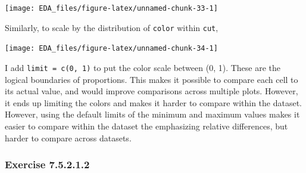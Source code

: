 \documentclass[]{book}
\newenvironment{Shaded}{\begin{snugshade}}{\end{snugshade}}
\newcommand{\DataTypeTok}[1]{\textcolor[rgb]{0.13,0.29,0.53}{#1}}
\newcommand{\DecValTok}[1]{\textcolor[rgb]{0.00,0.00,0.81}{#1}}
\newcommand{\KeywordTok}[1]{\textcolor[rgb]{0.13,0.29,0.53}{\textbf{#1}}}
\newcommand{\NormalTok}[1]{#1}
\newcommand{\OperatorTok}[1]{\textcolor[rgb]{0.81,0.36,0.00}{\textbf{#1}}}
\newcommand{\StringTok}[1]{\textcolor[rgb]{0.31,0.60,0.02}{#1}}
\theoremstyle{plain}
\theoremstyle{remark}
\begin{document}
\begin{center}\texttt{[image: EDA\_files/figure-latex/unnamed-chunk-33-1]} \end{center}

Similarly, to scale by the distribution of \texttt{color} within \texttt{cut},

\begin{Shaded}
\end{Shaded}

\begin{center}\texttt{[image: EDA\_files/figure-latex/unnamed-chunk-34-1]} \end{center}

I add \texttt{limit\ =\ c(0,\ 1)} to put the color scale between (0, 1).
These are the logical boundaries of proportions.
This makes it possible to compare each cell to its actual value, and would improve comparisons across multiple plots.
However, it ends up limiting the colors and makes it harder to compare within the dataset.
However, using the default limits of the minimum and maximum values makes it easier to compare within the dataset the emphasizing relative differences, but harder to compare across datasets.

\hypertarget{exercise-7.5.2.1.2}{%
\subsubsection*{\texorpdfstring{Exercise {7.5.2.1.2}}{Exercise 7.5.2.1.2}}\label{exercise-7.5.2.1.2}}
\end{document}
